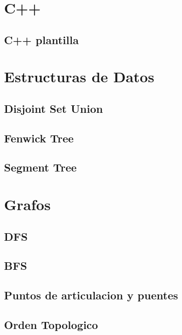 \section{C++}
\subsection{C++ plantilla}
\raggedbottom
\hrulefill

\section{Estructuras de Datos}
\subsection{Disjoint Set Union}
\raggedbottom
\hrulefill
\subsection{Fenwick Tree}
\raggedbottom
\hrulefill
\subsection{Segment Tree}
\raggedbottom
\hrulefill

\section{Grafos}
\subsection{DFS}
\raggedbottom
\hrulefill
\subsection{BFS}
\raggedbottom
\hrulefill
\subsection{Puntos de articulacion y puentes}
\raggedbottom
\hrulefill
\subsection{Orden Topologico}
\raggedbottom
\hrulefill
